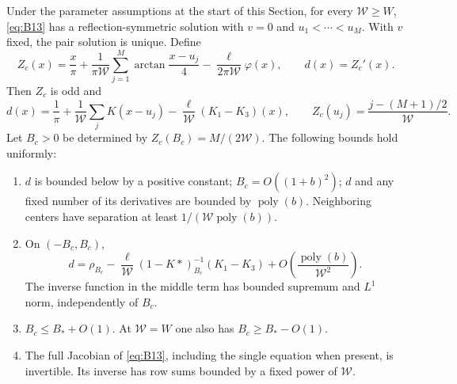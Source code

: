 \begin{lemma}
\label{lem:bethe-centers}
Under the parameter assumptions at the start of this Section, for every
$\mathcal W\geq W$, \eqref{eq:B13} has a reflection-symmetric solution
with $v=0$ and $u_1<\cdots<u_M$.  With $v$ fixed, the pair solution is
unique.  Define
\[
 Z_c(x)=\frac{x}{\pi}
    +\frac{1}{\pi\mathcal W}\sum_{j=1}^M
           \arctan\frac{x-u_j}{4}
    -\frac{\ell}{2\pi\mathcal W}\varphi(x),
 \qquad d(x)=Z_c'(x).
\]
Then $Z_c$ is odd and
\[
 d(x)=\frac1\pi+\frac1{\mathcal W}\sum_jK(x-u_j)
             -\frac\ell{\mathcal W}(K_1-K_3)(x),
 \qquad
 Z_c(u_j)=\frac{j-(M+1)/2}{\mathcal W}.
\]
Let $B_c>0$ be determined by $Z_c(B_c)=M/(2\mathcal W)$.
The following bounds hold uniformly:
\begin{enumerate}[label=\textup{(\roman*)}]
\item $d$ is bounded below by a positive constant;
      $B_c=O((1+b)^2)$; $d$ and any fixed number of its derivatives
      are bounded by $\operatorname{poly}(b)$.  Neighboring centers have
      separation at least $1/(\mathcal W\operatorname{poly}(b))$.
\item On $(-B_c,B_c)$,
\begin{equation}\label{eq:B14}
 d=\rho_{B_c}
  -\frac\ell{\mathcal W}(1-K*)_{B_c}^{-1}(K_1-K_3)
  +O\!\left(\frac{\operatorname{poly}(b)}{\mathcal W^2}\right).
\end{equation}
The inverse function in the middle term has bounded supremum and
$L^1$ norm, independently of $B_c$.
\item $B_c\leq B_*+O(1)$.  At $\mathcal W=W$ one also has
      $B_c\geq B_*-O(1)$.
\item The full Jacobian of \eqref{eq:B13}, including the single equation
      when present, is invertible.  Its inverse has row sums bounded
      by a fixed power of $\mathcal W$.
\end{enumerate}
\end{lemma}

